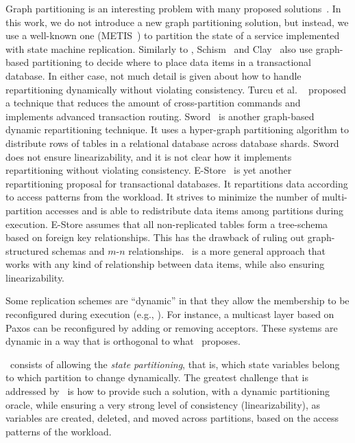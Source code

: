 Graph partitioning is an interesting problem with many proposed
solutions~\cite{Abou-Rjeili:2006,hendrickson2000graph,kernighan1970efficient,7004087}.
In this work, we do not introduce a new graph partitioning solution, but instead,
we use a well-known one (METIS~\cite{Abou-Rjeili:2006}) to partition the state
of a service implemented with state machine replication. Similarly to
\dynastar{}, Schism~\cite{curino2010sch} and Clay~\cite{SerafiniTEPAS16} also
use graph-based partitioning to decide where to place data items in a
transactional database. In either case, not much detail is given about how to
handle repartitioning dynamically without violating consistency. Turcu et al.
~\cite{7004087} proposed a technique that reduces the amount of cross-partition
commands and implements advanced transaction routing.
Sword~\cite{quamar2013sword} is another graph-based dynamic repartitioning
technique. It uses a hyper-graph partitioning algorithm to distribute rows of
tables in a relational database across database shards. Sword does not ensure
linearizability, and it is not clear how it implements repartitioning without
violating consistency. E-Store~\cite{taft2014est} is yet another repartitioning
proposal for transactional databases. It repartitions data according to access
patterns from the workload. It strives to minimize the number of multi-partition
accesses and is able to redistribute data items among partitions during
execution. E-Store assumes that all non-replicated tables form a tree-schema
based on foreign key relationships. This has the drawback of ruling out
graph-structured schemas and \mbox{$m$-$n$} relationships. \dynastar\ is a more
general approach that works with any kind of relationship between data items,
while also ensuring linearizability.

Some replication schemes are ``dynamic'' in that they allow the membership to be
reconfigured during execution (e.g.,
\cite{birman2010dsr,dustdar2007soc,guessoum2003dar}). For instance, a multicast
layer based on Paxos can be reconfigured by adding or removing acceptors. These
systems are dynamic in a way that is orthogonal to what \dynastar\ proposes.

\dynastar\ consists of allowing the \emph{state partitioning}, that is, which
state variables belong to which partition to change dynamically. The greatest
challenge that is addressed by \dynastar\ is how to provide such a solution,
with a dynamic partitioning oracle, while ensuring a very strong level of
consistency (linearizability), as variables are created, deleted, and moved
across partitions, based on the access patterns of the workload.